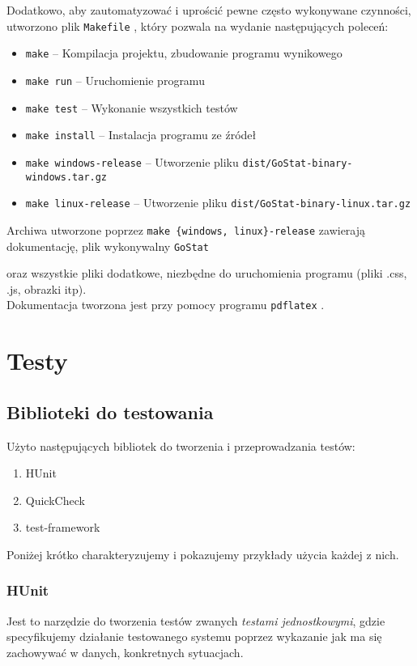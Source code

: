 \documentclass[10pt,leqno]{article}
\newcommand{\cmd}[1]{
  \texttt{#1}
}
\begin{document}
\noindent Dodatkowo, aby zautomatyzować i uprościć pewne często wykonywane czynności, utworzono plik \cmd{Makefile}, który
pozwala na wydanie następujących poleceń:

\begin{itemize}

\item \cmd{make} -- Kompilacja projektu, zbudowanie programu wynikowego
\item \cmd{make run} -- Uruchomienie programu
\item \cmd{make test} -- Wykonanie wszystkich testów
\item \cmd{make install} -- Instalacja programu ze źródeł
\item \cmd{make windows-release} -- Utworzenie pliku \cmd{dist/GoStat-binary-windows.tar.gz}
\item \cmd{make linux-release}   -- Utworzenie pliku \cmd{dist/GoStat-binary-linux.tar.gz}
\end{itemize}

\noindent Archiwa utworzone poprzez \cmd{make \{windows, linux\}-release} zawierają dokumentację, plik wykonywalny \cmd{GoStat}
oraz wszystkie pliki dodatkowe, niezbędne do uruchomienia programu (pliki .css, .js, obrazki itp). \\

\noindent Dokumentacja tworzona jest przy pomocy programu \cmd{pdflatex}.

\newpage

\section{Testy}

\subsection{Biblioteki do testowania}

Użyto następujących bibliotek do tworzenia i przeprowadzania testów:

\begin{enumerate}
\item HUnit
\item QuickCheck
\item test-framework
\end{enumerate}

\noindent Poniżej krótko charakteryzujemy i pokazujemy przykłady użycia każdej z nich.

\subsubsection{HUnit}
Jest to narzędzie do tworzenia testów zwanych \emph{testami jednostkowymi}, gdzie 
specyfikujemy działanie testowanego systemu poprzez wykazanie jak ma się zachowywać w
danych, konkretnych sytuacjach.
\end{document}
